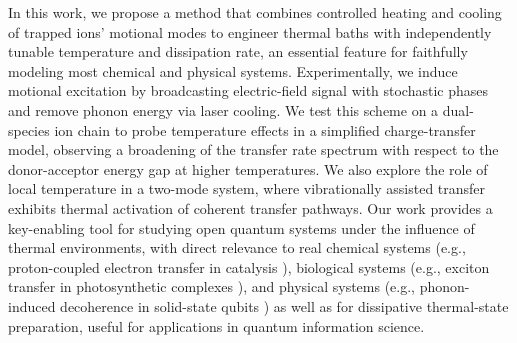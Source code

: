 \documentclass[
reprint,
superscriptaddress,

amsmath,amssymb,
aps,
prl,

floatfix,
]{revtex4-2}
\begin{document}
In this work, we propose a method that combines controlled heating and cooling of trapped ions’ motional modes to engineer thermal baths with independently tunable temperature and dissipation rate, an essential feature for faithfully modeling most chemical and physical systems. Experimentally, we induce motional excitation by broadcasting electric-field signal with stochastic phases and remove phonon energy via laser cooling. We test this scheme on a dual-species ion chain to probe temperature effects in a simplified charge-transfer model, observing a broadening of the transfer rate spectrum with respect to the donor-acceptor energy gap at higher temperatures. We also explore the role of local temperature in a two-mode system, where vibrationally assisted transfer exhibits thermal activation of coherent transfer pathways. Our work provides a key-enabling tool for studying open quantum systems under the influence of thermal environments, with direct relevance to real chemical systems (e.g., proton-coupled electron transfer in catalysis \cite{mayer2004proton}), biological systems (e.g., exciton transfer in photosynthetic complexes \cite{fassioli2014vibration}), and physical systems (e.g., phonon-induced decoherence in solid-state qubits \cite{jarmola2012diamond}) as well as for dissipative thermal-state preparation, useful for applications in quantum information science.

\end{document}

